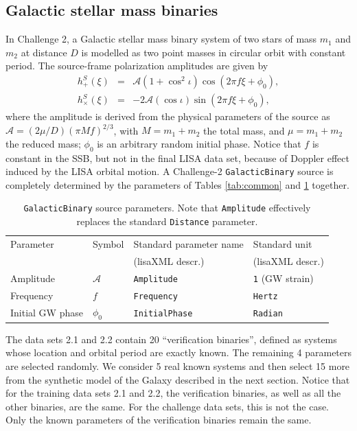 \documentclass[12pt]{iopart}
\begin{document}
\subsection{Galactic stellar mass binaries}
\label{ss:WD}

In Challenge 2, a Galactic stellar mass binary system of two stars of mass $m_1$ and $m_2$ at distance $D$  is modelled as two point masses in circular orbit with constant period. The source-frame polarization amplitudes are given by
%
\begin{eqnarray}
h^S_+(\xi)  & = & \mathcal{A} \left(1 + \cos^2{\iota}\right) \cos(2\pi f \xi + \phi_0), \\
h^S_\times(\xi) & = & -2 \mathcal{A} (\cos{\iota}) \sin(2\pi f \xi + \phi_0), \nonumber
\end{eqnarray}
%
where the amplitude is derived from the physical parameters of the source as $\mathcal{A} = (2 \mu / D) (\pi M f)^{2/3}$, with $M = m_1 + m_2$ the total mass, and $\mu = m_1 + m_2$ the reduced mass; $ \phi_0$ is an arbitrary random initial phase. Notice that $f$ is constant in the SSB, but not in the final LISA data set, because of Doppler effect induced by the LISA orbital motion.
A Challenge-2 \texttt{GalacticBinary} source is completely determined by the parameters of Tables \ref{tab:common} and \ref{tab:galactic} together.
%
\begin{table}
\begin{tabular}{llll}
\hline
{Parameter} &
{Symbol} &
{Standard parameter name} &
{Standard unit} \\
& & (lisaXML descr.) & (lisaXML descr.) \\
\hline
Amplitude           & $\mathcal{A}$ & \texttt{Amplitude}    & \texttt{1} (GW strain) \\
Frequency           & $f$           & \texttt{Frequency}    & \texttt{Hertz} \\
Initial GW phase    & $\phi_0$      & \texttt{InitialPhase} & \texttt{Radian} \\
\hline
\end{tabular}
\caption{\texttt{GalacticBinary} source parameters. Note that \texttt{Amplitude} effectively replaces the standard \texttt{Distance} parameter.\label{tab:galactic}}
\end{table}

The data sets 2.1 and 2.2 contain 20 ``verification binaries'', defined as systems whose location and orbital period are exactly known. The remaining 4 parameters are selected randomly. We consider 5 real known systems and then select 15 more from the synthetic model of the Galaxy described in the next section. Notice that for the training data sets 2.1 and 2.2, the verification binaries, as well as all the other binaries, are the same. For the challenge data sets, this is not the case. Only the known parameters of the verification binaries remain the same. 
\end{document}
